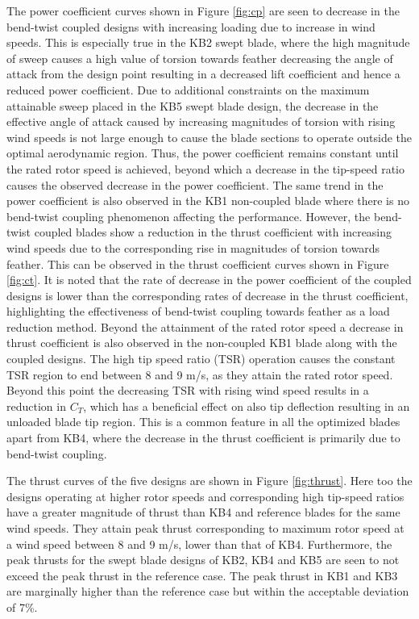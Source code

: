 The power coefficient curves shown in Figure \ref{fig:cp} are seen to decrease in the bend-twist coupled designs with increasing loading due to increase in wind speeds. This is especially true in the KB2 swept blade, where the high magnitude of sweep causes a high value of torsion towards feather decreasing the angle of attack from the design point resulting in a decreased lift coefficient and hence a reduced power coefficient. Due to additional constraints on the maximum attainable sweep placed in the KB5 swept blade design, the decrease in the effective angle of attack caused by increasing magnitudes of torsion with rising wind speeds is not large enough to cause the blade sections to operate outside the optimal aerodynamic region. Thus, the power coefficient remains constant until the rated rotor speed is achieved, beyond which a decrease in the tip-speed ratio causes the observed decrease in the power coefficient. The same trend in the power coefficient is also observed in the KB1 non-coupled blade where there is no bend-twist coupling phenomenon affecting the performance. However, the bend-twist coupled blades show a reduction in the thrust coefficient with increasing wind speeds due to the corresponding rise in magnitudes of torsion towards feather. This can be observed in the thrust coefficient curves shown in Figure \ref{fig:ct}. It is noted that the rate of decrease in the power coefficient of the coupled designs is lower than the corresponding rates of decrease in the thrust coefficient, highlighting the effectiveness of bend-twist coupling towards feather as a load reduction method. Beyond the attainment of the rated rotor speed a decrease in thrust coefficient is also observed in the non-coupled KB1 blade along with the coupled designs. The high tip speed ratio (TSR) operation causes the constant TSR region to end between 8 and 9 m/s, as they attain the rated rotor speed. Beyond this point the decreasing TSR with rising wind speed results in a reduction in $C_T$, which has a beneficial effect on also tip deflection resulting in an unloaded blade tip region. This is a common feature in all the optimized blades apart from KB4, where the decrease in the thrust coefficient is primarily due to bend-twist coupling.         

The thrust curves of the five designs are shown in Figure \ref{fig:thrust}. Here too the designs operating at higher rotor speeds and corresponding high tip-speed ratios have a greater magnitude of thrust than KB4 and reference blades for the same wind speeds. They attain peak thrust corresponding to maximum rotor speed at a wind speed between 8 and 9 m/s, lower than that of KB4. Furthermore, the peak thrusts for the swept blade designs of KB2, KB4 and KB5 are seen to not exceed the peak thrust in the reference case. The peak thrust in KB1 and KB3 are marginally higher than the reference case but within the acceptable deviation of 7\%.


